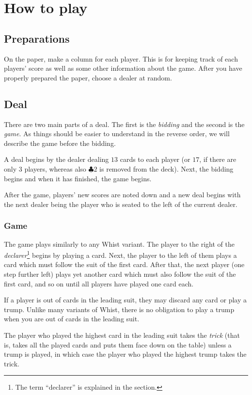 \documentclass[a4paper]{article}
\begin{document}
	\section{How to play}{%
		\subsection{Preparations}{%
			On the paper, make a column for each player. This is for keeping track of each players' score as well as some other information about the game. After you have properly prepared the paper, choose a dealer at random.
		}

		\subsection{Deal}{%
			There are two main parts of a deal. The first is the \emph{bidding} and the second is the \emph{game}. As things should be easier to understand in the reverse order, we will describe the game before the bidding.

			A deal begins by the dealer dealing $13$ cards to each player (or $17$, if there are only $3$ players, whereas also $\clubsuit 2$ is removed from the deck). Next, the bidding begins and when it has finished, the game begins.

			After the game, players' new scores are noted down and a new deal begins with the next dealer being the player who is seated to the left of the current dealer.

			\subsubsection{Game}{%
				The game plays similarly to any Whist variant. The player to the right of the \emph{declarer}\footnote{The term ``declarer'' is explained in the \textit{} section.} begins by playing a card. Next, the player to the left of them plays a card which must follow the suit of the first card. After that, the next player (one step further left) plays yet another card which must also follow the suit of the first card, and so on until all players have played one card each.

				If a player is out of cards in the leading suit, they may discard any card or play a trump. Unlike many variants of Whist, there is no obligation to play a trump when you are out of cards in the leading suit.

				The player who played the highest card in the leading suit takes the \emph{trick} (that is, takes all the played cards and puts them face down on the table) unless a trump is played, in which case the player who played the highest trump takes the trick.

}}}
\end{document}
